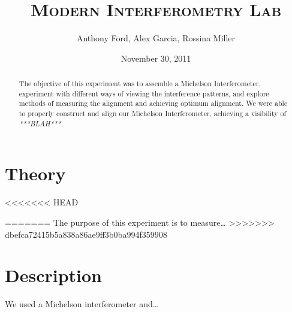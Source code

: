 \documentclass[12pt,titlepage,final]{article}
\begin{document}
\title{\textsc{Modern Interferometry Lab}}
\author{Anthony Ford, Alex Garcia, Rossina Miller}
\date{November 30, 2011}
\maketitle

\clearpage

\begin{abstract}
The objective of this experiment was to assemble a Michelson Interferometer,
experiment with different ways of viewing the interference patterns, and explore
methods of measuring the alignment and achieving optimum alignment. We were able
to properly construct and align our Michelson Interferometer, achieving a
visibility of \emph{***BLAH***}.
\end{abstract}



\section{Theory}

<<<<<<< HEAD

=======
The purpose of this experiment is to measure\ldots
>>>>>>> dbefca72415b5a838a86ae9ff3b0ba994f359908


\section{Description}

We used a Michelson interferometer and\ldots
\end{document}
